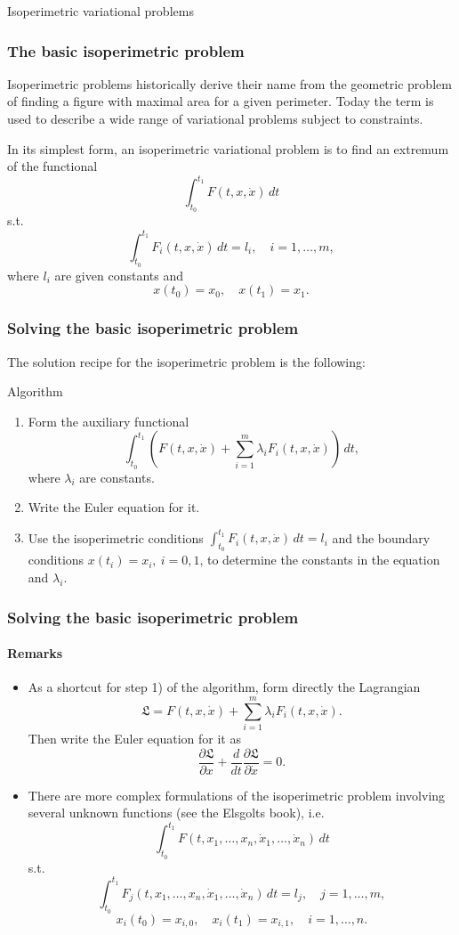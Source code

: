 \documentclass[10pt]{beamer}
\theoremstyle{definition}
\begin{document}
\begin{section}{Isoperimetric variational problems}\label{sec:Isoper}

\begin{frame}[fragile]
\frametitle{The basic isoperimetric problem}
Isoperimetric problems historically derive their name from the geometric problem of finding a figure with maximal area for a given perimeter. Today the term is used to describe a wide range of variational problems subject to constraints.\bigskip

In its simplest form, an isoperimetric variational problem is to find an extremum of the functional \[ \int_{t_0}^{t_1} F(t,x,\dot{x})\,dt \]
s.t. \[ \int_{t_0}^{t_1} F_i(t,x,\dot{x})\,dt = l_i,\quad i=1,\ldots,m, \] 
where $ l_i $ are given constants and \[ x(t_0)=x_0,\quad x(t_1)=x_1. \]
\end{frame}

\begin{frame}[fragile]
\frametitle{Solving the basic isoperimetric problem}
The solution recipe for the isoperimetric problem is the following:
\begin{block}{Algorithm}
\begin{enumerate}
\item Form the auxiliary functional \[ \int_{t_0}^{t_1}\left( F(t,x,\dot{x}) + \sum_{i=1}^{m}\lambda_i F_i(t,x,\dot{x})  \right)\,dt, \] where $ \lambda_i $ are constants.
\item Write the Euler equation for it.
\item Use the isoperimetric conditions $ \int_{t_0}^{t_1} F_i(t,x,\dot{x})\,dt = l_i $ and the boundary conditions $ x(t_i)=x_i,~i=0,1 $, to determine the constants in the equation and $ \lambda_i $.
\end{enumerate}
\end{block}
\end{frame}

\begin{frame}[fragile]
\frametitle{Solving the basic isoperimetric problem}
\framesubtitle{Remarks}
\begin{itemize}
\item As a shortcut for step 1) of the algorithm, form directly the Lagrangian \[ \mathfrak{L} = F(t,x,\dot{x}) + \sum_{i=1}^{m}\lambda_i F_i(t,x,\dot{x}) . \] Then write the Euler equation for it as \[ \dfrac{\partial \mathfrak{L}}{\partial x}+\dfrac{d}{dt}\dfrac{\partial \mathfrak{L}}{\partial \dot{x}}=0. \]
\item There are more complex formulations of the isoperimetric problem involving several unknown functions (see the Elsgolts book), i.e. \[ \int_{t_0}^{t_1} F(t,x_1,\ldots,x_n,\dot{x}_1,\ldots,\dot{x}_n)\,dt \]
s.t. \[ \int_{t_0}^{t_1} F_j(t,x_1,\ldots,x_n,\dot{x}_1,\ldots,\dot{x}_n)\,dt = l_j,\quad j=1,\ldots,m, \] 
\[ x_i(t_0)=x_{i,0},\quad x_i(t_1)=x_{i,1}, \quad i=1,\ldots,n. \]
\end{itemize}
\end{frame}


\end{section}
\end{document}
